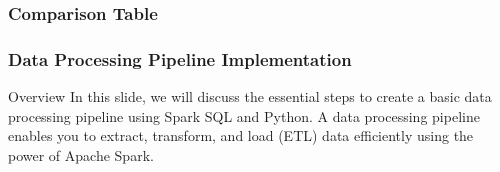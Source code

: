 \documentclass[aspectratio=169]{beamer}
\begin{document}
\begin{frame}[fragile]
    \frametitle{Comparison Table}
\end{frame}

\begin{frame}
  \frametitle{Data Processing Pipeline Implementation}
  \begin{block}{Overview}
    In this slide, we will discuss the essential steps to create a basic data processing pipeline using Spark SQL and Python. A data processing pipeline enables you to extract, transform, and load (ETL) data efficiently using the power of Apache Spark.
  \end{block}
\end{frame}
\end{document}
